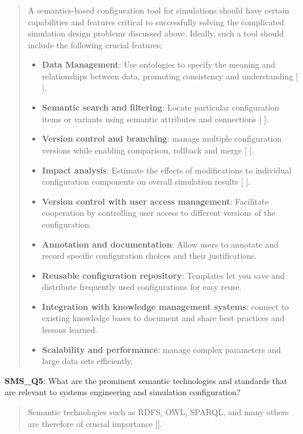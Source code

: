             \begin{quote}
                A semantics-based configuration tool for simulations should have certain capabilities and features critical to successfully solving the complicated simulation design problems discussed above. Ideally, such a tool should include the following crucial features:
                \begin{itemize}
                    \item \textbf{Data Management}: Use ontologies to specify the meaning and relationships between data, promoting consistency and understanding [ ].
                    \item \textbf{Semantic search and filtering}: Locate particular configuration items or variants using semantic attributes and connections [ ].
                    \item \textbf{Version control and branching}: manage multiple configuration versions while enabling comparison, rollback and merge [ ].
                    \item \textbf{Impact analysis}: Estimate the effects of modifications to individual configuration components on overall simulation results [ ].
                    \item \textbf{Version control with user access management}: Facilitate cooperation by controlling user access to different versions of the configuration.
                    \item \textbf{Annotation and documentation}: Allow users to annotate and record specific configuration choices and their justifications.
                    \item \textbf{Reusable configuration repository}: Templates let you save and distribute frequently used configurations for easy reuse.
                    \item \textbf{Integration with knowledge management systems}: connect to existing knowledge bases to document and share best practices and lessons learned.
                    \item \textbf{Scalability and performance}: manage complex parameters and large data sets efficiently.\\
                \end{itemize}
            \end{quote}

            \textbf{SMS\_Q5}: What are the prominent semantic technologies and standards that are relevant to systems engineering and simulation configuration?
            \begin{quote}
                Semantic technologies such as RDFS, OWL, SPARQL, and many others are therefore of crucial importance [].\\
            \end{quote}

